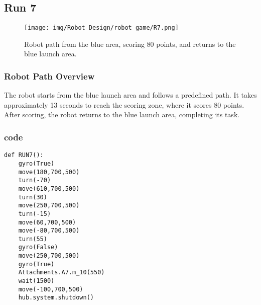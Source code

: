 \newpage
\subsection{Run 7}
\begin{figure}[h]
    \centering
    \texttt{[image: img/Robot Design/robot game/R7.png]}
    \caption{Robot path from the blue area, scoring 80 points, and returns to the blue launch area.}
    \label{fig:robot_path}
\end{figure}
\subsubsection{Robot Path Overview}

The robot starts from the blue launch area and follows a predefined path. It takes approximately 13 seconds to reach the scoring zone, where it scores 80 points. After scoring, the robot returns to the blue launch area, completing its task.
\subsubsection{code}
\begin{lstlisting}
def RUN7():
    gyro(True)
    move(180,700,500) 
    turn(-70)
    move(610,700,500)
    turn(30)
    move(250,700,500)
    turn(-15)
    move(60,700,500)
    move(-80,700,500)
    turn(55)
    gyro(False)
    move(250,700,500)
    gyro(True)
    Attachments.A7.m_10(550)
    wait(1500)
    move(-100,700,500)
    hub.system.shutdown()
\end{lstlisting}


